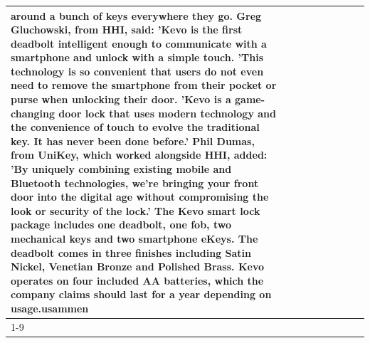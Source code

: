 \begin{table}[H]
\begin{tabular}{lllrlllll}
around a bunch of keys everywhere they go. Greg Gluchowski, from HHI, said: 'Kevo is the first deadbolt intelligent enough to communicate with a smartphone and unlock with a simple touch. 'This technology is so convenient that users do not even need to remove the smartphone from their pocket or purse when unlocking their door. 'Kevo is a game-changing door lock that uses modern technology and the convenience of touch to evolve the traditional key. It has never been done before.' Phil Dumas, from UniKey, which worked alongside HHI, added: 'By uniquely combining existing mobile and Bluetooth technologies, we’re bringing your front door into the digital age without compromising the look or security of the lock.' The Kevo smart lock package includes one deadbolt, one fob, two mechanical keys and two smartphone eKeys. The deadbolt comes in three finishes including Satin Nickel, Venetian Bronze and Polished Brass. Kevo operates on four included AA batteries, which the company claims should last for a year depending on usage.usammen \\
\cline{1-9}

\end{tabular}
\end{table}
